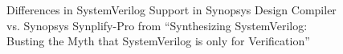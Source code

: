 
\begin{figure}[t]
    \centering
    \caption[
        Inconsistencies in SystemVerilog Support in synthesis tools
    ]{
        Differences in SystemVerilog Support in Synopsys Design Compiler vs. Synopsys Synplify-Pro from ``Synthesizing SystemVerilog: Busting the Myth that SystemVerilog is only for Verification'' \cite{sutherland}
    }
    \label{fig:dc_vs_synplify}
\end{figure}
